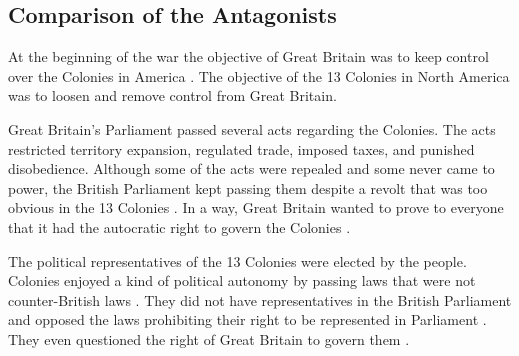 \subsection{Comparison of the Antagonists}

At the beginning of the war the objective of Great Britain was to keep control
over the Colonies in America \cite[126]{ladenburg_causes_1989}
\cite[45]{stewart_2005}.  The objective of the 13 Colonies in North America was
to loosen and remove control from Great Britain.

Great Britain’s Parliament passed several acts regarding the Colonies.  The acts
restricted territory expansion, regulated trade, imposed taxes, and punished
disobedience.  Although some of the acts were repealed and some never came to
power, the British Parliament kept passing them despite a revolt that was too
obvious in the 13 Colonies \cite[90,107-109]{ladenburg_causes_1989}.  In a way, Great Britain
wanted to prove to everyone that it had the autocratic right to govern the
Colonies \cite[126]{ladenburg_causes_1989}.

The political representatives of the 13 Colonies were elected by the people.
Colonies enjoyed a kind of political autonomy by passing laws that were not
counter-British laws \cite[p.71]{ladenburg_causes_1989}.  They did not have representatives in
the British Parliament and opposed the laws prohibiting their right to be
represented in Parliament \cite[p.91]{ladenburg_causes_1989}.  They even questioned the right of
Great Britain to govern them \cite[p.96]{ladenburg_causes_1989}.

